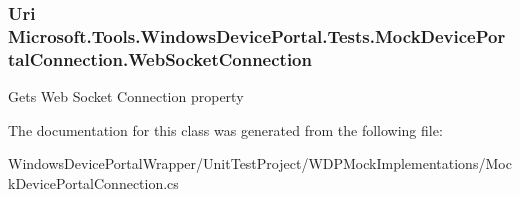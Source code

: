 \subsubsection[{\texorpdfstring{Web\+Socket\+Connection}{WebSocketConnection}}]{\setlength{\rightskip}{0pt plus 5cm}Uri Microsoft.\+Tools.\+Windows\+Device\+Portal.\+Tests.\+Mock\+Device\+Portal\+Connection.\+Web\+Socket\+Connection\hspace{0.3cm}{\ttfamily [get]}}\hypertarget{class_microsoft_1_1_tools_1_1_windows_device_portal_1_1_tests_1_1_mock_device_portal_connection_a560252908982a10cff4b7d00b6c805cb}{}\label{class_microsoft_1_1_tools_1_1_windows_device_portal_1_1_tests_1_1_mock_device_portal_connection_a560252908982a10cff4b7d00b6c805cb}


Gets Web Socket Connection property 



The documentation for this class was generated from the following file\+:\begin{DoxyCompactItemize}
\item 
Windows\+Device\+Portal\+Wrapper/\+Unit\+Test\+Project/\+W\+D\+P\+Mock\+Implementations/Mock\+Device\+Portal\+Connection.\+cs\end{DoxyCompactItemize}
